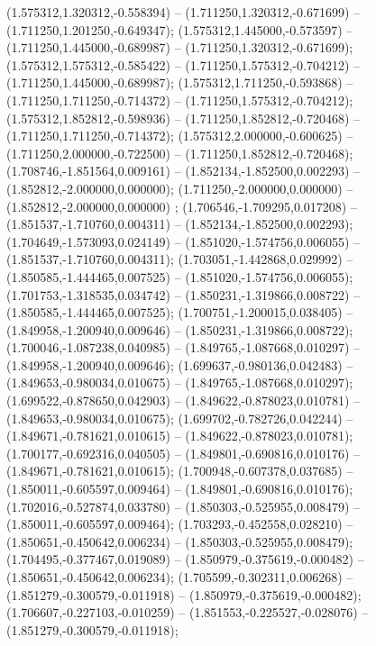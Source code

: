  (1.575312,1.320312,-0.558394) -- (1.711250,1.320312,-0.671699) -- (1.711250,1.201250,-0.649347);
 (1.575312,1.445000,-0.573597) -- (1.711250,1.445000,-0.689987) -- (1.711250,1.320312,-0.671699);
 (1.575312,1.575312,-0.585422) -- (1.711250,1.575312,-0.704212) -- (1.711250,1.445000,-0.689987);
 (1.575312,1.711250,-0.593868) -- (1.711250,1.711250,-0.714372) -- (1.711250,1.575312,-0.704212);
 (1.575312,1.852812,-0.598936) -- (1.711250,1.852812,-0.720468) -- (1.711250,1.711250,-0.714372);
 (1.575312,2.000000,-0.600625) -- (1.711250,2.000000,-0.722500) -- (1.711250,1.852812,-0.720468);
 (1.708746,-1.851564,0.009161) -- (1.852134,-1.852500,0.002293) -- (1.852812,-2.000000,0.000000);
 (1.711250,-2.000000,0.000000) -- (1.852812,-2.000000,0.000000) ;
 (1.706546,-1.709295,0.017208) -- (1.851537,-1.710760,0.004311) -- (1.852134,-1.852500,0.002293);
 (1.704649,-1.573093,0.024149) -- (1.851020,-1.574756,0.006055) -- (1.851537,-1.710760,0.004311);
 (1.703051,-1.442868,0.029992) -- (1.850585,-1.444465,0.007525) -- (1.851020,-1.574756,0.006055);
 (1.701753,-1.318535,0.034742) -- (1.850231,-1.319866,0.008722) -- (1.850585,-1.444465,0.007525);
 (1.700751,-1.200015,0.038405) -- (1.849958,-1.200940,0.009646) -- (1.850231,-1.319866,0.008722);
 (1.700046,-1.087238,0.040985) -- (1.849765,-1.087668,0.010297) -- (1.849958,-1.200940,0.009646);
 (1.699637,-0.980136,0.042483) -- (1.849653,-0.980034,0.010675) -- (1.849765,-1.087668,0.010297);
 (1.699522,-0.878650,0.042903) -- (1.849622,-0.878023,0.010781) -- (1.849653,-0.980034,0.010675);
 (1.699702,-0.782726,0.042244) -- (1.849671,-0.781621,0.010615) -- (1.849622,-0.878023,0.010781);
 (1.700177,-0.692316,0.040505) -- (1.849801,-0.690816,0.010176) -- (1.849671,-0.781621,0.010615);
 (1.700948,-0.607378,0.037685) -- (1.850011,-0.605597,0.009464) -- (1.849801,-0.690816,0.010176);
 (1.702016,-0.527874,0.033780) -- (1.850303,-0.525955,0.008479) -- (1.850011,-0.605597,0.009464);
 (1.703293,-0.452558,0.028210) -- (1.850651,-0.450642,0.006234) -- (1.850303,-0.525955,0.008479);
 (1.704495,-0.377467,0.019089) -- (1.850979,-0.375619,-0.000482) -- (1.850651,-0.450642,0.006234);
 (1.705599,-0.302311,0.006268) -- (1.851279,-0.300579,-0.011918) -- (1.850979,-0.375619,-0.000482);
 (1.706607,-0.227103,-0.010259) -- (1.851553,-0.225527,-0.028076) -- (1.851279,-0.300579,-0.011918);

